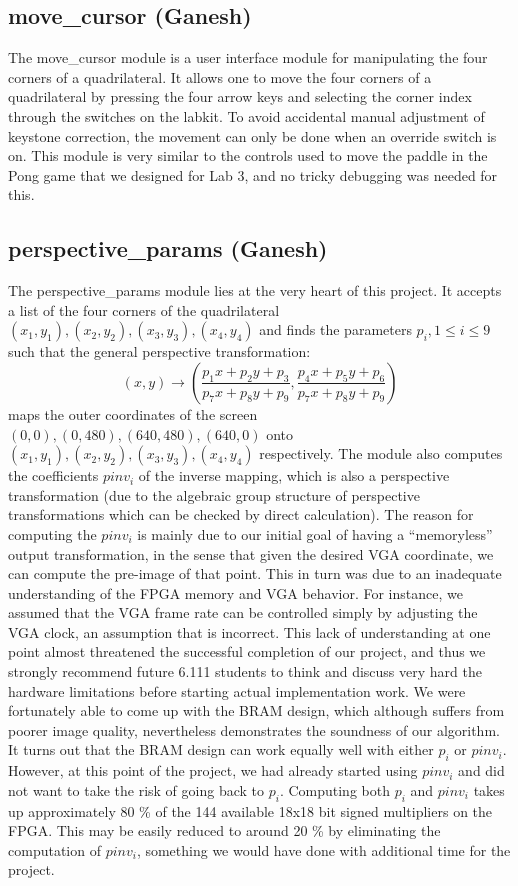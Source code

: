 \documentclass{article}
\begin{document}
\subsection{move\_cursor (Ganesh)}
The move\_cursor module is a user interface module for manipulating the four corners of a quadrilateral.
It allows one to move the four corners of a quadrilateral by pressing the four arrow keys and selecting the corner index through the switches on the labkit.
To avoid accidental manual adjustment of keystone correction,
the movement can only be done when an override switch is on.
This module is very similar to the controls used to move the paddle in the Pong game that we designed for Lab 3,
and no tricky debugging was needed for this.

\subsection{perspective\_params (Ganesh)}
The perspective\_params module lies at the very heart of this project.
It accepts a list of the four corners of the quadrilateral $(x_1, y_1), (x_2, y_2), (x_3, y_3), (x_4, y_4)$
and finds the parameters $p_i, 1 \leq i \leq 9$ such that the general perspective transformation:
\begin{equation}
\label{eqn:perspective_transform}
(x, y) \rightarrow \left( \frac{p_1 x + p_2 y + p_3}{p_7 x + p_8 y + p_9}, \frac{p_4 x + p_5 y + p_6}{p_7 x + p_8 y + p_9} \right)
\end{equation}
maps the outer coordinates of the screen $(0, 0), (0, 480), (640, 480), (640, 0)$ onto $(x_1, y_1), (x_2, y_2), (x_3, y_3), (x_4, y_4)$ respectively.
The module also computes the coefficients $pinv_i$ of the inverse mapping, which is also a perspective transformation
(due to the algebraic group structure of perspective transformations which can be checked by direct calculation).
The reason for computing the $pinv_i$ is mainly due to our initial goal of having a ``memoryless'' output transformation,
in the sense that given the desired VGA coordinate, we can compute the pre-image of that point.
This in turn was due to an inadequate understanding of the FPGA memory and VGA behavior.
For instance, we assumed that the VGA frame rate can be controlled simply by adjusting the VGA clock,
an assumption that is incorrect.
This lack of understanding at one point almost threatened the successful completion of our project,
and thus we strongly recommend future 6.111 students to think and discuss very hard the hardware limitations before starting actual implementation work.
We were fortunately able to come up with the BRAM design, which although suffers from poorer image quality,
nevertheless demonstrates the soundness of our algorithm.
It turns out that the BRAM design can work equally well with either $p_i$ or $pinv_i$.
However, at this point of the project, we had already started using $pinv_i$ and did not want to take the risk of going back to $p_i$.
Computing both $p_i$ and $pinv_i$ takes up approximately 80 \% of the 144 available 18x18 bit signed multipliers on the FPGA.
This may be easily reduced to around 20 \% by eliminating the computation of $pinv_i$,
something we would have done with additional time for the project.
\end{document}
